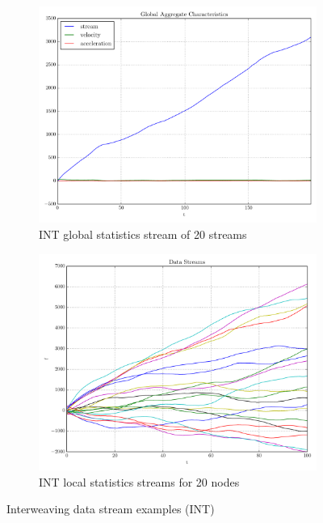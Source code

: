 \begin{figure}[t!]
\centering
\begin{subfigure}[t]{0.49\textwidth}
\centering
\includegraphics[scale=0.38, trim=2cm 0 0 0]{img/interweaving1D20N_global.pdf}
\caption{INT global statistics stream of 20 streams}
\end{subfigure}
\begin{subfigure}[t]{0.49\textwidth}
\centering
\includegraphics[scale=0.38]{img/interweaving1D20N_streams.pdf}
\caption{INT local statistics streams for 20 nodes} 
\end{subfigure}
\vspace{0.5cm}
\caption{Interweaving data stream examples (INT)}\label{fig:intStreams}
\end{figure}

